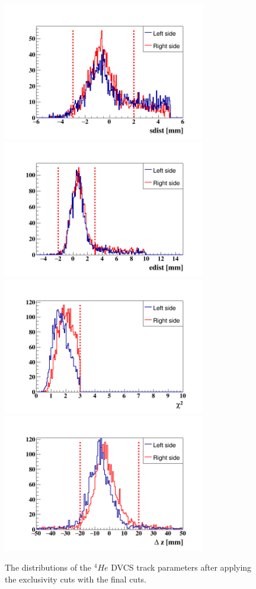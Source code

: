 \begin{figure}[h!]
\includegraphics[height=6.0cm]{new_plots/rtpc_sdist.png}
\includegraphics[height=6.0cm]{new_plots/after_rtpc_edist.png}
\includegraphics[height=6.0cm]{new_plots/after_rtpc_X2.png}
\includegraphics[height=6.0cm]{new_plots/after_rtpc_delta_z.png}
\caption{The distributions of the $^{4}He$ DVCS track parameters after applying 
the exclusivity cuts with the final cuts.}
\label{fig:He_pid_cuts}
\end{figure}






